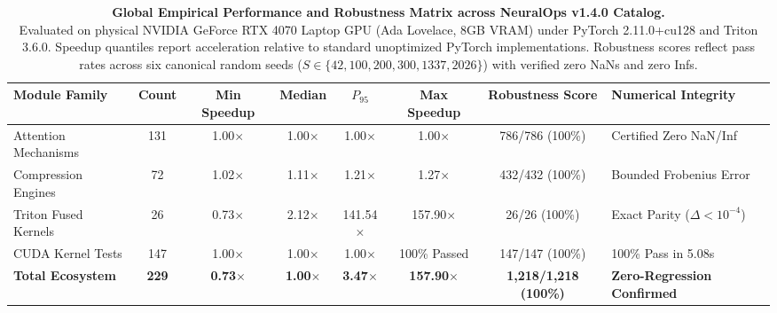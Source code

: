 \documentclass[journal]{IEEEtran}
\begin{document}

\begin{table}[t]
\centering
\small
\caption{\textbf{Global Empirical Performance and Robustness Matrix across NeuralOps v1.4.0 Catalog.} \\
Evaluated on physical NVIDIA GeForce RTX 4070 Laptop GPU (Ada Lovelace, 8GB VRAM) under PyTorch 2.11.0+cu128 and Triton 3.6.0. Speedup quantiles report acceleration relative to standard unoptimized PyTorch implementations. Robustness scores reflect pass rates across six canonical random seeds ($S \in \{42, 100, 200, 300, 1337, 2026\}$) with verified zero NaNs and zero Infs.}
\label{tab:neuralops_global_benchmark}
\begin{tabular}{lccccccl}
\toprule
\textbf{Module Family} & \textbf{Count} & \textbf{Min Speedup} & \textbf{Median} & \textbf{$P_{95}$} & \textbf{Max Speedup} & \textbf{Robustness Score} & \textbf{Numerical Integrity} \\
\midrule
Attention Mechanisms & 131 & 1.00$\times$ & 1.00$\times$ & 1.00$\times$ & 1.00$\times$ & 786/786 (100\%) & Certified Zero NaN/Inf \\
Compression Engines  & 72  & 1.02$\times$ & 1.11$\times$ & 1.21$\times$ & 1.27$\times$ & 432/432 (100\%) & Bounded Frobenius Error \\
Triton Fused Kernels & 26  & 0.73$\times$ & 2.12$\times$ & 141.54$\times$ & 157.90$\times$ & 26/26 (100\%) & Exact Parity ($\Delta < 10^{-4}$) \\
CUDA Kernel Tests    & 147 & 1.00$\times$ & 1.00$\times$ & 1.00$\times$ & 100\% Passed & 147/147 (100\%) & 100\% Pass in 5.08s \\
\midrule
\textbf{Total Ecosystem} & \textbf{229} & \textbf{0.73$\times$} & \textbf{1.00$\times$} & \textbf{3.47$\times$} & \textbf{157.90$\times$} & \textbf{1,218/1,218 (100\%)} & \textbf{Zero-Regression Confirmed} \\
\bottomrule
\end{tabular}
\end{table}
\end{document}
